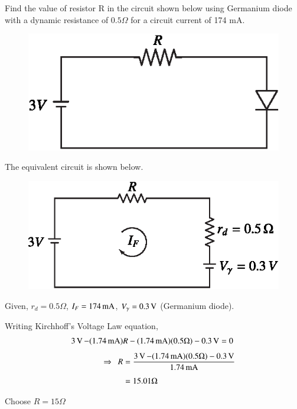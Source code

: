 \begin{example}\label{exam1.16}
Find the value of resistor R in the circuit shown below using
Germanium diode with a dynamic resistance of $0.5 \Omega$ for a
circuit current of 174 mA.
\begin{figure}[H]
\centering
\includegraphics{chap1/exp1.16.eps}
\end{figure}
\end{example}

\begin{solution}
The equivalent circuit is shown below.
\begin{figure}[H]
\centering
\includegraphics[scale=.95]{chap1/sol1.16.eps}
\end{figure}

Given, $r_d = 0.5 \Omega$, $I_F = 174 \operatorname{mA}$, $V_\gamma =0.3 \operatorname{\mathrm{V}}$
(Germanium diode). 

\smallskip

Writing Kirchhoff's Voltage Law equation,
\begin{align*}
3 \operatorname{\mathrm{V}} - (1.74 \operatorname{mA}) & R - (1.74 \operatorname{mA}) (0.5 \Omega) - 0.3 \operatorname{\mathrm{V}} = 0\\[4pt]
\Rightarrow ~~ R & = \frac{3\operatorname{\mathrm{V}} - (1.74 \operatorname{mA}) (0.5\Omega)-0.3 \operatorname{\mathrm{V}}}{1.74
  \operatorname{mA}}\\[4pt]
& = 15.01 \Omega
\end{align*} 

Choose $R = 15 \Omega$
\end{solution}

